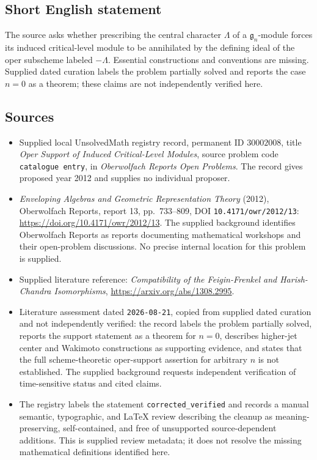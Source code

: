 \documentclass[11pt]{article}
\begin{document}
\subsection{Short English statement}
The source asks whether prescribing the central character \(\Lambda\) of a \(\mathfrak g_n\)-module forces its induced critical-level module to be annihilated by the defining ideal of the oper subscheme labeled \(-\Lambda\). Essential constructions and conventions are missing. Supplied dated curation labels the problem partially solved and reports the case \(n=0\) as a theorem; these claims are not independently verified here.
\subsection{Sources}
\begin{itemize}
\item Supplied local UnsolvedMath registry record, permanent ID \(30002008\), title \emph{Oper Support of Induced Critical-Level Modules}, source problem code \texttt{catalogue entry}, in \emph{Oberwolfach Reports Open Problems}. The record gives proposed year 2012 and supplies no individual proposer.
\item \emph{Enveloping Algebras and Geometric Representation Theory} (2012), Oberwolfach Reports, report 13, pp.\ 733--809, DOI \texttt{10.4171/owr/2012/13}: \url{https://doi.org/10.4171/owr/2012/13}. The supplied background identifies Oberwolfach Reports as reports documenting mathematical workshops and their open-problem discussions. No precise internal location for this problem is supplied.
\item Supplied literature reference: \emph{Compatibility of the Feigin-Frenkel and Harish-Chandra Isomorphisms}, \url{https://arxiv.org/abs/1308.2995}.
\item Literature assessment dated \texttt{2026-08-21}, copied from supplied dated curation and not independently verified: the record labels the problem partially solved, reports the support statement as a theorem for \(n=0\), describes higher-jet center and Wakimoto constructions as supporting evidence, and states that the full scheme-theoretic oper-support assertion for arbitrary \(n\) is not established. The supplied background requests independent verification of time-sensitive status and cited claims.
\item The registry labels the statement \texttt{corrected\_verified} and records a manual semantic, typographic, and LaTeX review describing the cleanup as meaning-preserving, self-contained, and free of unsupported source-dependent additions. This is supplied review metadata; it does not resolve the missing mathematical definitions identified here.
\end{itemize}
\end{document}
